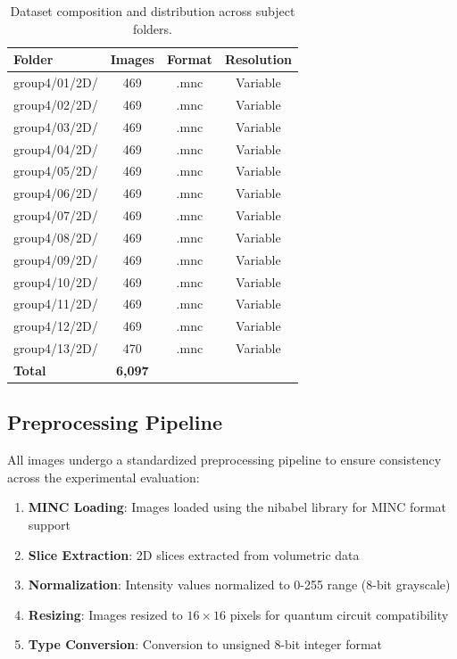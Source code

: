 \documentclass{ipol}
\begin{document}
\begin{table}[!htbp]
\caption{Dataset composition and distribution across subject folders.}
\label{tab:dataset}
\centering
\begin{tabular}{@{}lccc@{}}
\toprule
Folder & Images & Format & Resolution \\
\midrule
group4/01/2D/ & 469 & .mnc & Variable \\
group4/02/2D/ & 469 & .mnc & Variable \\
group4/03/2D/ & 469 & .mnc & Variable \\
group4/04/2D/ & 469 & .mnc & Variable \\
group4/05/2D/ & 469 & .mnc & Variable \\
group4/06/2D/ & 469 & .mnc & Variable \\
group4/07/2D/ & 469 & .mnc & Variable \\
group4/08/2D/ & 469 & .mnc & Variable \\
group4/09/2D/ & 469 & .mnc & Variable \\
group4/10/2D/ & 469 & .mnc & Variable \\
group4/11/2D/ & 469 & .mnc & Variable \\
group4/12/2D/ & 469 & .mnc & Variable \\
group4/13/2D/ & 470 & .mnc & Variable \\
\midrule
\textbf{Total} & \textbf{6,097} & & \\
\bottomrule
\end{tabular}
\end{table}

\subsection{Preprocessing Pipeline}

All images undergo a standardized preprocessing pipeline to ensure consistency across the experimental evaluation:

\begin{enumerate}
\item \textbf{MINC Loading}: Images loaded using the nibabel library for MINC format support
\item \textbf{Slice Extraction}: 2D slices extracted from volumetric data
\item \textbf{Normalization}: Intensity values normalized to 0-255 range (8-bit grayscale)
\item \textbf{Resizing}: Images resized to $16 \times 16$ pixels for quantum circuit compatibility
\item \textbf{Type Conversion}: Conversion to unsigned 8-bit integer format
\end{enumerate}
\end{document}
